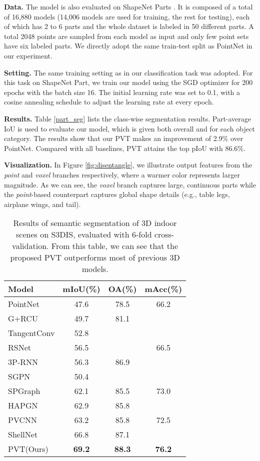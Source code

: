 \documentclass[10pt,twocolumn,letterpaper]{article}
\begin{document}
\textbf{Data. }The model is also evaluated on ShapeNet Parts \cite{shapenet}. It is composed of a total of 16,880 models (14,006 models are used for training, the rest for testing), each of which has 2 to 6 parts and the whole dataset is labeled in 50 different parts. A total 2048 points are sampled from each model as input and only few point sets have six labeled parts. We directly adopt the same train-test split as PointNet in our experiment.

\textbf{Setting. } 
The same training setting as in our classification task was adopted. For this task on ShapeNet Part, we train our model using the SGD optimizer for 200 epochs with the batch size 16. The initial learning rate was set to 0.1, with a cosine annealing schedule to adjust the learning rate at every epoch.

\textbf{Results.} Table \ref{part_seg} lists the class-wise segmentation results. Part-average IoU is used to evaluate our model, which is given both overall and for each object category. The results show that our PVT makes an improvement of 2.9\% over PointNet. Compared with all baselines, PVT attains the top pIoU with 86.6\%. 

\textbf{Visualization.}  In Figure \ref{fig:disentangle}, we illustrate output features from the \emph{point} and \emph{voxel} branches respectively, where a warmer color represents larger magnitude. As we can see, the \emph{voxel} branch captures large, continuous parts while the \emph{point}-based counterpart captures global shape details (e.g., table legs, airplane wings, and tail).


\begin{table}  
\centering
\begin{center} 
\begin{tabular}{|l|ccc|}   
\hline
Model & mIoU(\%) & OA(\%) & mAcc(\%)\\ 
\hline
PointNet & 47.6 & 78.5 & 66.2   \\
G+RCU \cite{2017Exploring} & 49.7 & 81.1 & \\
TangentConv \cite{2018Tangent} & 52.8 &  &     \\
RSNet \cite{mehta2018rs} & 56.5 &  & 66.5 \\
3P-RNN \cite{ye20183d} & 56.3 & 86.9 &  \\
SGPN \cite{wang2018sgpn} & 50.4 &  & \\
SPGraph \cite{2018Large} & 62.1 & 85.5 & 73.0\\
HAPGN \cite{9141427} & 62.9 & 85.8 & \\
PVCNN & 63.2 & 85.8 & 72.5\\
ShellNet \cite{2019ShellNet} & 66.8 & 87.1 &\\
PVT(Ours) & \textbf{69.2}& \textbf{88.3} &  \textbf{76.2}\\
\hline
\end{tabular}  
\end{center}  
\caption{Results of semantic segmentation of 3D indoor scenes on S3DIS, evaluated with 6-fold cross-validation. From this table, we can see that the proposed PVT outperforms most of previous 3D models.} 
\label{6fold}
\end{table} 
\end{document}

